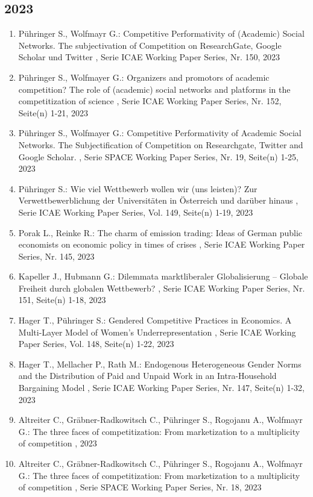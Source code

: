  \subsection*{2023} 
 \begin{enumerate}[leftmargin=*, labelsep=0.5cm] 
	 \item Pühringer S., Wolfmayr G.:  Competitive Performativity of (Academic) Social Networks. The subjectivation of Competition on ResearchGate, Google Scholar und Twitter  , Serie ICAE Working Paper Series, Nr. 150, 2023
	 \item Pühringer S., Wolfmayer G.:  Organizers and promotors of academic competition? The role of (academic) social networks and platforms in the competitization of science  , Serie ICAE Working Paper Series, Nr. 152, Seite(n) 1-21, 2023
	 \item Pühringer S., Wolfmayer G.:  Competitive Performativity of Academic Social Networks. The Subjectification of Competition on Researchgate, Twitter and Google Scholar.  , Serie SPACE Working Paper Series, Nr. 19, Seite(n) 1-25, 2023
	 \item Pühringer S.:  Wie viel Wettbewerb wollen wir (uns leisten)? Zur Verwettbewerblichung der Universitäten in Österreich und darüber hinaus  , Serie ICAE Working Paper Series, Vol. 149, Seite(n) 1-19, 2023
	 \item Porak L., Reinke R.:  The charm of emission trading: Ideas of German public economists on economic policy in times of crises  , Serie ICAE Working Paper Series, Nr. 145, 2023
	 \item Kapeller J., Hubmann G.:  Dilemmata marktliberaler Globalisierung – Globale Freiheit durch globalen Wettbewerb?  , Serie ICAE Working Paper Series, Nr. 151, Seite(n) 1-18, 2023
	 \item Hager T., Pühringer S.:  Gendered Competitive Practices in Economics. A Multi-Layer Model of Women’s Underrepresentation  , Serie ICAE Working Paper Series, Vol. 148, Seite(n) 1-22, 2023
	 \item Hager T., Mellacher P., Rath M.:  Endogenous Heterogeneous Gender Norms and the Distribution of Paid and Unpaid Work in an Intra-Household Bargaining Model  , Serie ICAE Working Paper Series, Nr. 147, Seite(n) 1-32, 2023
	 \item Altreiter C., Gräbner-Radkowitsch C., Pühringer S., Rogojanu A., Wolfmayr G.:  The three faces of competitization: From marketization to a multiplicity of competition  , 2023
	 \item Altreiter C., Gräbner-Radkowitsch C., Pühringer S., Rogojanu A., Wolfmayr G.:  The three faces of competitization: From marketization to a multiplicity of competition  , Serie SPACE Working Paper Series, Nr. 18, 2023
\end{enumerate} 
